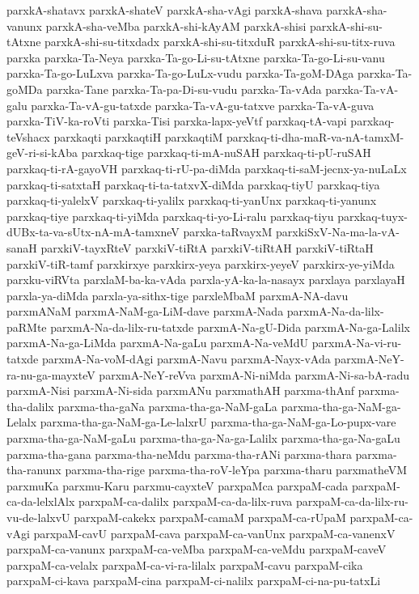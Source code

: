 {parxkA-shatavx
parxkA-shateV
parxkA-sha-vAgi
parxkA-shava
parxkA-sha-vanunx
parxkA-sha-veMba
parxkA-shi-kAyAM
parxkA-shisi
parxkA-shi-su-tAtxne
parxkA-shi-su-titxdadx
parxkA-shi-su-titxduR
parxkA-shi-su-titx-ruva
parxka
parxka-Ta-Neya
parxka-Ta-go-Li-su-tAtxne
parxka-Ta-go-Li-su-vanu
parxka-Ta-go-LuLxva
parxka-Ta-go-LuLx-vudu
parxka-Ta-goM-DAga
parxka-Ta-goMDa
parxka-Tane
parxka-Ta-pa-Di-su-vudu
parxka-Ta-vAda
parxka-Ta-vA-galu
parxka-Ta-vA-gu-tatxde
parxka-Ta-vA-gu-tatxve
parxka-Ta-vA-guva
parxka-TiV-ka-roVti
parxka-Tisi
parxka-lapx-yeVtf
parxkaq-tA-vapi
parxkaq-teVshacx
parxkaqti
parxkaqtiH
parxkaqtiM
parxkaq-ti-dha-maR-va-nA-tamxM-geV-ri-si-kAba
parxkaq-tige
parxkaq-ti-mA-nuSAH
parxkaq-ti-pU-ruSAH
parxkaq-ti-rA-gayoVH
parxkaq-ti-rU-pa-diMda
parxkaq-ti-saM-jecnx-ya-nuLaLx
parxkaq-ti-satxtaH
parxkaq-ti-ta-tatxvX-diMda
parxkaq-tiyU
parxkaq-tiya
parxkaq-ti-yalelxV
parxkaq-ti-yalilx
parxkaq-ti-yanUnx
parxkaq-ti-yanunx
parxkaq-tiye
parxkaq-ti-yiMda
parxkaq-ti-yo-Li-ralu
parxkaq-tiyu
parxkaq-tuyx-dUBx-ta-va-sUtx-nA-mA-tamxneV
parxka-taRvayxM
parxkiSxV-Na-ma-la-vA-sanaH
parxkiV-tayxRteV
parxkiV-tiRtA
parxkiV-tiRtAH
parxkiV-tiRtaH
parxkiV-tiR-tamf
parxkirxye
parxkirx-yeya
parxkirx-yeyeV
parxkirx-ye-yiMda
parxku-viRVta
parxlaM-ba-ka-vAda
parxla-yA-ka-la-nasayx
parxlaya
parxlayaH
parxla-ya-diMda
parxla-ya-sithx-tige
parxleMbaM
parxmA-NA-davu
parxmANaM
parxmA-NaM-ga-LiM-dave
parxmA-Nada
parxmA-Na-da-lilx-paRMte
parxmA-Na-da-lilx-ru-tatxde
parxmA-Na-gU-Dida
parxmA-Na-ga-Lalilx
parxmA-Na-ga-LiMda
parxmA-Na-gaLu
parxmA-Na-veMdU
parxmA-Na-vi-ru-tatxde
parxmA-Na-voM-dAgi
parxmA-Navu
parxmA-Nayx-vAda
parxmA-NeY-ra-nu-ga-mayxteV
parxmA-NeY-reVva
parxmA-Ni-niMda
parxmA-Ni-sa-bA-radu
parxmA-Nisi
parxmA-Ni-sida
parxmANu
parxmathAH
parxma-thAnf
parxma-tha-dalilx
parxma-tha-gaNa
parxma-tha-ga-NaM-gaLa
parxma-tha-ga-NaM-ga-Lelalx
parxma-tha-ga-NaM-ga-Le-lalxrU
parxma-tha-ga-NaM-ga-Lo-pupx-vare
parxma-tha-ga-NaM-gaLu
parxma-tha-ga-Na-ga-Lalilx
parxma-tha-ga-Na-gaLu
parxma-tha-gana
parxma-tha-neMdu
parxma-tha-rANi
parxma-thara
parxma-tha-ranunx
parxma-tha-rige
parxma-tha-roV-leYpa
parxma-tharu
parxmatheVM
parxmuKa
parxmu-Karu
parxmu-cayxteV
parxpaMca
parxpaM-cada
parxpaM-ca-da-lelxlAlx
parxpaM-ca-dalilx
parxpaM-ca-da-lilx-ruva
parxpaM-ca-da-lilx-ru-vu-de-lalxvU
parxpaM-cakekx
parxpaM-camaM
parxpaM-ca-rUpaM
parxpaM-ca-vAgi
parxpaM-cavU
parxpaM-cava
parxpaM-ca-vanUnx
parxpaM-ca-vanenxV
parxpaM-ca-vanunx
parxpaM-ca-veMba
parxpaM-ca-veMdu
parxpaM-caveV
parxpaM-ca-velalx
parxpaM-ca-vi-ra-lilalx
parxpaM-cavu
parxpaM-cika
parxpaM-ci-kava
parxpaM-cina
parxpaM-ci-nalilx
parxpaM-ci-na-pu-tatxLi
}
